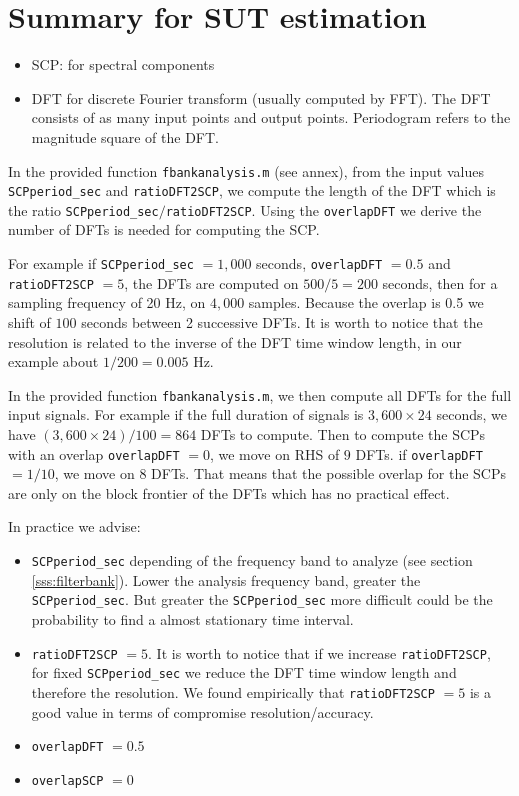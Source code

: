 \section{Summary for SUT estimation}
\begin{itemize}
\item
SCP: for spectral components
\item
DFT for discrete Fourier transform (usually computed by FFT). The DFT consists of as many input points and output points. Periodogram refers to the magnitude square of the DFT.
\end{itemize}

In the provided function {\tt fbankanalysis.m} (see annex), from the input values {\tt SCPperiod\_sec} and {\tt ratioDFT2SCP}, we compute the length of the DFT which is the ratio  {\tt SCPperiod\_sec}$/${\tt ratioDFT2SCP}. Using the {\tt overlapDFT} we derive the number of DFTs is needed for computing the SCP.

For example if {\tt SCPperiod\_sec} $=1,\!000$ seconds, {\tt overlapDFT} $= 0.5$ and  {\tt ratioDFT2SCP} $=5$, the DFTs are computed on $500/5=200$ seconds, then for a sampling frequency of 20 Hz, on $4,\!000$ samples. Because the overlap is 0.5 we shift  of $100$ seconds between 2 successive DFTs. It is worth to notice that the resolution is related to the inverse of the DFT time window length, in our example about $1/200=0.005$ Hz.

In the provided function {\tt fbankanalysis.m}, we then compute all DFTs for the full input signals. For example if the full duration  of signals is $3,\!600\times 24$ seconds, we have  $(3,\!600 \times 24)/100=864$ DFTs to compute. Then to compute the SCPs with an overlap {\tt overlapDFT} $=0$, we move on RHS of $9$ DFTs. if {\tt overlapDFT} $=1/10$, we move on $8$ DFTs. That means that the possible overlap for the SCPs are only on the block frontier of the DFTs which has no practical effect.

In practice we advise:
\begin{itemize}
\item
{\tt SCPperiod\_sec} depending of the frequency band to analyze (see section \ref{sss:filterbank}). Lower the analysis frequency band, greater the {\tt SCPperiod\_sec}. But greater the  {\tt SCPperiod\_sec} more difficult could be the probability to find a almost stationary time interval.
\item
{\tt ratioDFT2SCP} $=5$. It is worth to notice that if we increase {\tt ratioDFT2SCP}, for fixed  {\tt SCPperiod\_sec} we reduce the DFT time window length and therefore the resolution. We found empirically that  {\tt ratioDFT2SCP} $=5$ is a good value in terms of compromise resolution/accuracy.
\item
{\tt overlapDFT} $= 0.5$
\item
{\tt overlapSCP} $= 0$
\end{itemize}

